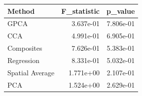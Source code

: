 \begin{tabular}{lrr}
\toprule
Method & F_statistic & p_value \\
\midrule
GPCA & 3.637e-01 & 7.806e-01 \\
CCA & 4.991e-01 & 6.905e-01 \\
Composites & 7.626e-01 & 5.383e-01 \\
Regression & 8.331e-01 & 5.032e-01 \\
Spatial Average & 1.771e+00 & 2.107e-01 \\
PCA & 1.524e+00 & 2.629e-01 \\
\bottomrule
\end{tabular}
